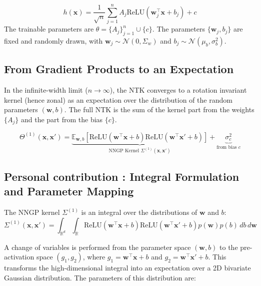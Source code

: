 \documentclass[11pt]{article}
\newcommand{\ReLU}{\mathrm{ReLU}}
\begin{document}
\begin{tcolorbox}[colback=yellow!10,colframe=yellow!80!black,title={\textbf{Single-Layer MMNN Definition}},enhanced,drop shadow,boxrule=2pt]
\begin{equation}
    \boxed{h(\bm{x}) = \frac{1}{\sqrt{n}} \sum_{j=1}^n A_j \ReLU(\bm{w}_j^\top \bm{x} + b_j) + c}
\end{equation}
The trainable parameters are $\theta = \{A_j\}_{j=1}^n \cup \{c\}$. The parameters $\{\bm{w}_j, b_j\}$ are fixed and randomly drawn, with $\bm{w}_j \sim \mathcal{N}(0, \Sigma_w)$ and $b_j \sim \mathcal{N}(\mu_b, \sigma_b^2)$.
\end{tcolorbox}

\subsection{From Gradient Products to an Expectation}
In the infinite-width limit ($n \to \infty$), the NTK converges to a rotation invariant kernel (hence zonal) as an expectation over the distribution of the random parameters $(\bm{w}, b)$. The full NTK is the sum of the kernel part from the weights $\{A_j\}$ and the part from the bias $\{c\}$.

\begin{tcolorbox}[colback=blue!10,colframe=blue!80!black,title={\textbf{NTK as Expectation}},enhanced,drop shadow,boxrule=2pt]
\begin{equation}
\label{eq:ntk_expectation}
    \boxed{\Theta^{(1)}(\bm{x}, \bm{x}') = \underbrace{\mathbb{E}_{\bm{w},b} \left[ \ReLU(\bm{w}^\top \bm{x} + b)\ReLU(\bm{w}^\top \bm{x}' + b) \right]}_{\text{NNGP Kernel } \Sigma^{(1)}(\bm{x}, \bm{x}')} + \underbrace{\sigma_c^2}_{\text{from bias } c}}
\end{equation}
\end{tcolorbox}

\subsection{Personal contribution : Integral Formulation and Parameter Mapping}
The NNGP kernel $\Sigma^{(1)}$ is an integral over the distributions of $\bm{w}$ and $b$:
\begin{equation}
    \Sigma^{(1)}(\bm{x}, \bm{x}') = \int_{\mathbb{R}^d} \int_{\mathbb{R}} \ReLU(\bm{w}^\top \bm{x} + b)\ReLU(\bm{w}^\top \bm{x}' + b) p(\bm{w})p(b) \,db \,d\bm{w}
\end{equation}

A change of variables is performed from the parameter space $(\bm{w}, b)$ to the pre-activation space $(g_1, g_2)$, where $g_1 = \bm{w}^\top \bm{x} + b$ and $g_2 = \bm{w}^\top \bm{x}' + b$. This transforms the high-dimensional integral into an expectation over a 2D bivariate Gaussian distribution. The parameters of this distribution are:
\end{document}
